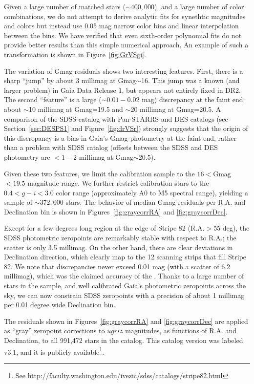 Given a large number of matched stars ($\sim 400,000$), and a large number of color combinations,
we do not attempt to derive analytic fits for synethtic magnitudes and colors but instead
use 0.05 mag narrow color bins and linear interpolation between the bins. We have verified
that even sixth-order polynomial fits do not provide better results than this simple 
numerical approach. An example of such a transformation is shown in Figure~\ref{fig:GrVSgi}. 

The variation of Gmag residuals shows two interesting features. First, there is a sharp
``jump'' by about 3 millimag at Gmag$\sim$16.  This jump was a known (and 
larger problem) in Gaia Data Release 1, but appears not entirely fixed in DR2. The 
second ``feature'' is a large ($\sim0.01-0.02$ mag) discrepancy at the faint end:
about $\sim$10 millimag at Gmag=19.5 and $\sim$20 millimag at Gmag=20.5. 
A comparison of the SDSS catalog with Pan-STARRS and DES catalogs (see 
Section~\ref{sec:DESPS1} and Figure~\ref{fig:drVSr}) strongly suggests that the
origin of this discrepancy is a bias in Gaia's Gmag photometry at the faint end, rather 
than a problem with SDSS catalog (offsets between the SDSS and DES
photometry are $<1-2$ millimag at Gmag$\sim$20.5). 
 
Given these two features, we limit the calibration sample to the $16<$Gmag$<19.5$
magnitude range. We further restrict calibration stars to the $0.4 < g-i < 3.0$ color 
range (approximately A0 to M5 spectral range), yielding a sample of $\sim372,000$ stars. 
The behavior of median Gmag residuals per R.A. and Declination bin is shown in 
Figures~\ref{fig:graycorrRA} and \ref{fig:graycorrDec}. 

Except for a few degrees long region at the edge of Stripe 82 (R.A.$>$55 deg), the
SDSS photometric zeropoints are remarkably stable with respect to R.A.; the scatter
is only 3.5 millimag. On the other hand, there are clear deviations in Declination 
direction, which clearly map to the 12 scanning strips that fill Stripe 82. We note
that discrepancies never exceed 0.01 mag (with a scatter of 6.2 millimag), which was 
the claimed accuracy of the \pOc. Thanks to a large number of stars in the sample,
and well calibrated Gaia's photometric zeropoints across the sky, we can now 
constrain SDSS zeropoints with a precision of about 1 millimag per 0.01 degree
wide Declination bin. 

The residuals shown in Figures~\ref{fig:graycorrRA} and \ref{fig:graycorrDec} are
applied as ``gray'' zeropoint corrections to $ugriz$ magnitudes, as functions of 
R.A. and Declination, to all 991,472 stars in the catalog. This catalog version was
labeled v3.1, and it is publicly available\footnote{See http://faculty.washington.edu/ivezic/sdss/catalogs/stripe82.html}. 

